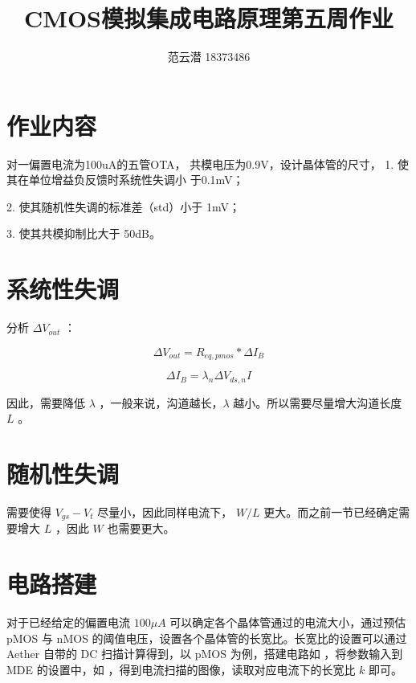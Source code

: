 \documentclass[lang=cn,11pt,a4paper,cite=authoryear]{elegantpaper}
\title{CMOS模拟集成电路原理\quad 第五周作业}
\author{范云潜 18373486}
\institute{微电子学院 184111 班}
\date{\zhtoday}
\begin{document}
\maketitle


\tableofcontents

\listoffigures

\section{作业内容}

对一偏置电流为100uA的五管OTA，
共模电压为0.9V，设计晶体管的尺寸，
1. 使其在单位增益负反馈时系统性失调小
于0.1mV；

2. 使其随机性失调的标准差（std）小于
1mV；

3. 使其共模抑制比大于 50dB。




\section{系统性失调}

分析 \(\Delta V_{out}\) ：

\[\Delta V_{out} = R_{eq, pmos} * \Delta I_B \]


\[\Delta I_B = \lambda_n \Delta V_{ds, n} I\]

因此，需要降低 \(\lambda\) ，一般来说，沟道越长，\(\lambda\) 越小。所以需要尽量增大沟道长度 \(L\) 。


\section{随机性失调}

需要使得 \(V_{gs}-V_t\) 尽量小，因此同样电流下， \(W/L\) 更大。而之前一节已经确定需要增大 \(L\) ，因此 \(W\) 也需要更大。

\section{电路搭建}

对于已经给定的偏置电流 \(100 \mu A\) 可以确定各个晶体管通过的电流大小，通过预估 pMOS 与 nMOS 的阈值电压，设置各个晶体管的长宽比。长宽比的设置可以通过 Aether 自带的 DC 扫描计算得到，以 pMOS 为例，搭建电路如  ，将参数输入到 MDE 的设置中，如 ，得到电流扫描的图像，读取对应电流下的长宽比 \(k\) 即可。
\end{document}
